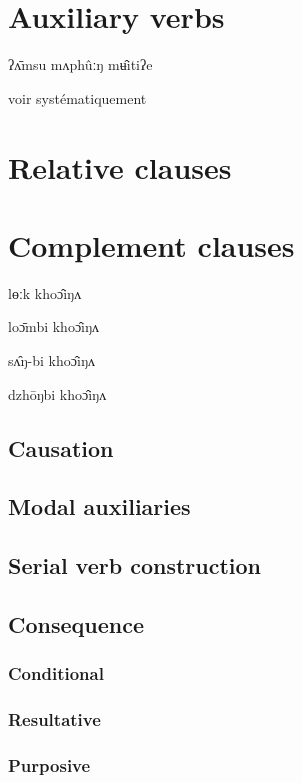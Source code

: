 \documentclass[oldfontcommands,oneside,a4paper,11pt]{memoir}
\begin{document}
 
\chapter{Auxiliary verbs} \label{chapt:aux}
ʔʌ̄msu      mʌphûːŋ  mʉ̂itiʔe
 
 
 voir systématiquement
\chapter{Relative clauses} \label{chapt:relative}

	
\chapter{Complement clauses}
lɵːk khoɔ̂iŋʌ

loɔ̄mbi khoɔ̂iŋʌ

sʌ̂ŋ-bi khoɔ̂iŋʌ

dzhōŋbi khoɔ̂iŋʌ


\section{Causation} \label{sec:causation.complement}


\section{Modal auxiliaries}

\section{Serial verb construction} \label{sec:serial.verb}

\section{Consequence}


\subsection{Conditional}

\subsection{Resultative}

\subsection{Purposive}
\end{document}
